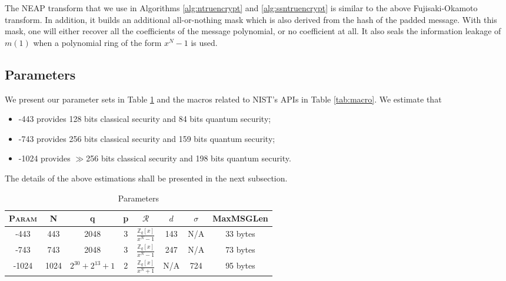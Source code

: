 \documentclass{llncs}
\newcommand{\ZZ}{\mathbb{Z}}
\newcommand{\ntru}{{\sf{NTRU}}}
\newcommand{\<}{\langle}
\renewcommand{\>}{\rangle}
\begin{document}
The NEAP \cite{DBLP:conf/ctrsa/Howgrave-GrahamSW05} transform that we
use in Algorithms \ref{alg:ntruencrypt} and \ref{alg:ssntruencrypt} is 
similar to the above Fujisaki-Okamoto transform. In addition, it builds 
an additional all-or-nothing mask which is also derived from the hash
of the padded message. With this mask, one will either recover all the 
coefficients of the message polynomial, or no coefficient at all. It
also seals the information leakage of $m(1)$ when a polynomial ring of the form
$x^N-1$ is used.
\subsection{Parameters}


We present our parameter sets in Table \ref{tab:param} and the macros related  to NIST's APIs in Table \ref{tab:macro}.
We estimate that 
\begin{itemize}
\item \ntru-443 provides 128 bits classical security
and 84 bits quantum security;
\item \ntru-743 provides 256 bits classical security
and 159 bits quantum security;
\item \ntru-1024 provides $\gg$256 bits classical security
and 198 bits quantum security.
\end{itemize}
The details of the above estimations shall be presented in the next subsection.
\begin{table}
\centering
\caption{Parameters}
\label{tab:param}
\begin{tabular}{|c|c|c|c|c|c|c|c|}\hline
\textsc{Param} &N & q & p &$\mathcal{R}$ & $d$ & $\sigma$ & MaxMSGLen\\\hline\hline
\ntru-443&443 & 2048 & 3 & $\frac{\ZZ_q[x]}{x^N-1}$ & 143 & N/A & 33 bytes\\%
\ntru-743&743 & 2048 & 3 & $\frac{\ZZ_q[x]}{x^N-1}$ & 247 & N/A & 73 bytes\\%
\ntru-1024&1024 & $2^{30}+2^{13}+1$ & 2 & $\frac{\ZZ_q[x]}{x^N+1}$ & N/A & 724 & 95 bytes\\\hline
\end{tabular}
\end{table}
\end{document}
